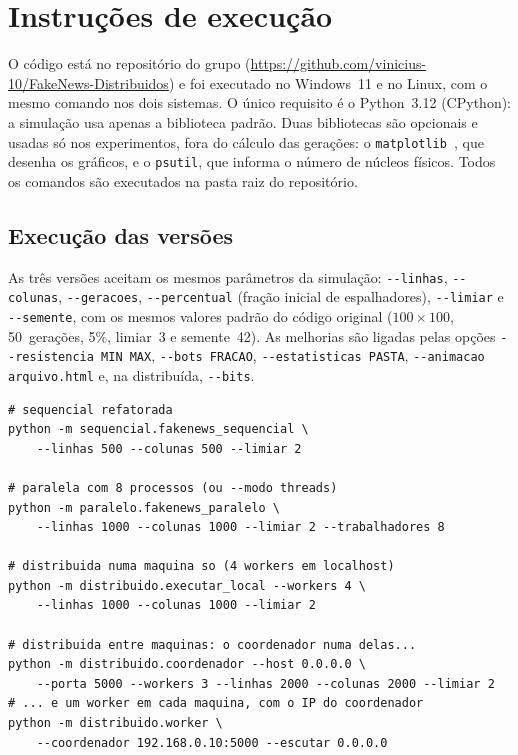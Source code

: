 
\chapter{Instruções de execução}\label{apendice:execucao}

O código está no repositório do grupo (\url{https://github.com/vinicius-10/FakeNews-Distribuidos}) e foi executado no Windows~11 e no Linux, com o mesmo comando nos dois sistemas. O único requisito é o Python~3.12 (CPython): a simulação usa apenas a biblioteca padrão. Duas bibliotecas são opcionais e usadas só nos experimentos, fora do cálculo das gerações: o \texttt{matplotlib}~\cite{Hunter2007}, que desenha os gráficos, e o \texttt{psutil}, que informa o número de núcleos físicos. Todos os comandos são executados na pasta raiz do repositório.

\section{Execução das versões}

As três versões aceitam os mesmos parâmetros da simulação: \texttt{-{}-linhas}, \texttt{-{}-colunas}, \texttt{-{}-geracoes}, \texttt{-{}-percentual} (fração inicial de espalhadores), \texttt{-{}-limiar} e \texttt{-{}-semente}, com os mesmos valores padrão do código original ($100 \times 100$, 50~gerações, 5\%, limiar~3 e semente~42). As melhorias são ligadas pelas opções \texttt{-{}-resistencia MIN MAX}, \texttt{-{}-bots FRACAO}, \texttt{-{}-estatisticas PASTA}, \texttt{-{}-animacao arquivo.html} e, na distribuída, \texttt{-{}-bits}.

{\small
\begin{verbatim}
# sequencial refatorada
python -m sequencial.fakenews_sequencial \
    --linhas 500 --colunas 500 --limiar 2

# paralela com 8 processos (ou --modo threads)
python -m paralelo.fakenews_paralelo \
    --linhas 1000 --colunas 1000 --limiar 2 --trabalhadores 8

# distribuida numa maquina so (4 workers em localhost)
python -m distribuido.executar_local --workers 4 \
    --linhas 1000 --colunas 1000 --limiar 2

# distribuida entre maquinas: o coordenador numa delas...
python -m distribuido.coordenador --host 0.0.0.0 \
    --porta 5000 --workers 3 --linhas 2000 --colunas 2000 --limiar 2
# ... e um worker em cada maquina, com o IP do coordenador
python -m distribuido.worker \
    --coordenador 192.168.0.10:5000 --escutar 0.0.0.0
\end{verbatim}
}

